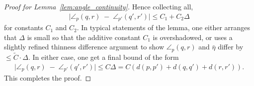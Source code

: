 \begin{proof}[Proof for Lemma~\ref{lem:angle_continuity}]
    Hence collecting all,
    \begin{align*}
        \bigl|\angle_p(q,r) \;-\; \angle_{p'}(q',r')\bigr| \leq C_1 + C_2\Delta
    \end{align*}
    for constants $C_1$ and $C_2$.
    In typical statements of the lemma, one either arranges that $\Delta$ is small so that the additive constant $C_1$ is overshadowed, or uses a slightly refined thinness difference argument to show $\angle_p(q,r)$ and $\bar{\eta}$ differ by $\le \tilde{C}\cdot\Delta$.
    In either case, one get a final bound of the form
    \begin{align*}
        \bigl|\angle_p(q,r) \;-\; \angle_{p'}(q',r')\bigr| \leq C\Delta = C(d(p,p') + d(q,q') + d(r,r')).
    \end{align*}
    This completes the proof.
\end{proof}

